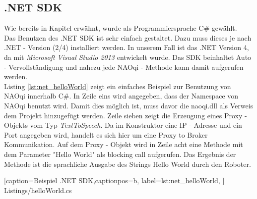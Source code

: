 \subsection{.NET SDK}
Wie bereits in Kapitel  erwähnt, wurde als Programmiersprache C\# gewählt. 
\\
Das Benutzen des .NET SDK ist sehr einfach gestaltet. Dazu muss dieses je nach .NET - Version (2/4) installiert werden. In unserem Fall ist das .NET Version 4, da mit \textit{Microsoft Visual Studio 2013} entwickelt wurde. Das SDK beinhaltet Auto - Vervollständigung und nahezu jede NAOqi - Methode kann damit aufgerufen werden.
\\
 Listing \ref{lst:net_helloWorld} zeigt ein einfaches Beispiel zur Benutzung von NAOqi innerhalb C\#. In Zeile eins wird angegeben, dass der Namespace von NAOqi benutzt wird. Damit dies möglich ist, muss davor die \textsf{naoqi.dll} als Verweis dem Projekt hinzugefügt werden. Zeile sieben zeigt die Erzeugung eines Proxy - Objekts vom Typ \textit{TextToSpeech}. Da im Konstruktor eine IP - Adresse und ein Port angegeben wird, handelt es sich hier um eine Proxy to Broker Kommunikation. Auf dem Proxy - Objekt wird in Zeile acht eine Methode mit dem Parameter \textsf{"Hello World"} als blocking call aufgerufen. Das Ergebnis der Methode ist die sprachliche Ausgabe des Strings \textsf{Hello World} durch den Roboter.


    [caption={Beispiel .NET SDK},captionpos=b,
       label=lst:net_helloWorld,
       ]	
 {Listings/helloWorld.cs}


